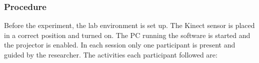 \subsubsection{Procedure}
Before the experiment, the lab environment is set up. The Kinect sensor is placed in a correct position and turned on. The PC running the software is started and the projector is enabled. In each session only one participant is present and guided by the researcher. The activities each participant followed are:
